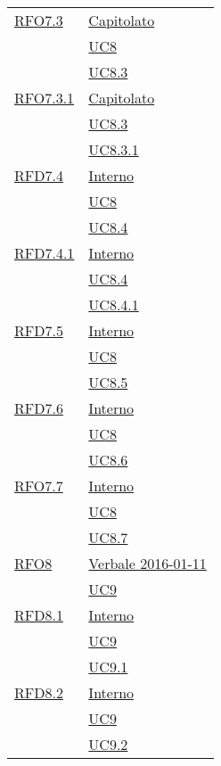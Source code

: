 \begin{longtable}{|>{\centering}m{5cm}|m{5cm}<{\centering}|}
\hyperlink{RFO7.3}{RFO7.3} & \hyperlink{Capitolato}{Capitolato}\\
& \hyperref[UC8]{UC8}\\
& \hyperref[UC8.3]{UC8.3}\\ \hline

\hyperlink{RFO7.3.1}{RFO7.3.1} & \hyperlink{Capitolato}{Capitolato}\\
& \hyperref[UC8.3]{UC8.3}\\
& \hyperref[UC8.3.1]{UC8.3.1}\\ \hline

\hyperlink{RFD7.4}{RFD7.4} & \hyperlink{Interno}{Interno}\\
& \hyperref[UC8]{UC8}\\
& \hyperref[UC8.4]{UC8.4}\\ \hline

\hyperlink{RFD7.4.1}{RFD7.4.1} & \hyperlink{Interno}{Interno}\\
& \hyperref[UC8.4]{UC8.4}\\
& \hyperref[UC8.4.1]{UC8.4.1}\\ \hline

\hyperlink{RFD7.5}{RFD7.5} & \hyperlink{Interno}{Interno}\\
& \hyperref[UC8]{UC8}\\
& \hyperref[UC8.5]{UC8.5}\\ \hline

\hyperlink{RFD7.6}{RFD7.6} & \hyperlink{Interno}{Interno}\\
& \hyperref[UC8]{UC8}\\
& \hyperref[UC8.6]{UC8.6}\\ \hline

\hyperlink{RFO7.7}{RFO7.7} & \hyperlink{Interno}{Interno}\\
& \hyperref[UC8]{UC8}\\
& \hyperref[UC8.7]{UC8.7}\\ \hline

\hyperlink{RFO8}{RFO8} & \hyperlink{Verbale 2016-01-11}{Verbale 2016-01-11}\\
& \hyperref[UC9]{UC9}\\ \hline

\hyperlink{RFD8.1}{RFD8.1} & \hyperlink{Interno}{Interno}\\
& \hyperref[UC9]{UC9}\\
& \hyperref[UC9.1]{UC9.1}\\ \hline

\hyperlink{RFD8.2}{RFD8.2} & \hyperlink{Interno}{Interno}\\
& \hyperref[UC9]{UC9}\\
& \hyperref[UC9.2]{UC9.2}\\ \hline


\end{longtable}
